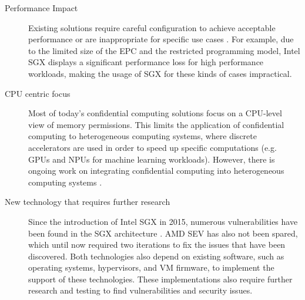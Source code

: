 \begin{description}
  \item[Performance Impact]
    Existing solutions require careful configuration to achieve acceptable
    performance or are inappropriate for specific use cases
    \cite{akram2021performance}. For example, due to the limited size of the EPC
    and the restricted programming model, Intel SGX displays a significant
    performance loss for high performance workloads, making the usage of SGX for
    these kinds of cases impractical.
  \item[CPU centric focus]
    Most of today's confidential computing solutions focus on a CPU-level view
    of memory permissions. This limits the application of confidential computing
    to heterogeneous computing systems, where discrete accelerators are used in
    order to speed up specific computations (e.g. GPUs and NPUs for machine
    learning workloads). However, there is ongoing work on integrating
    confidential computing into heterogeneous computing systems
    \cite{jiang2022cronus}.
  \item[New technology that requires further research]
    Since the introduction of Intel SGX in 2015, numerous vulnerabilities have
    been found in the SGX architecture \cite{fei2021sgxvulnerabilities}. AMD SEV
    has also not been spared, which until now required two iterations to fix the
    issues that have been discovered. Both technologies also depend on existing
    software, such as operating systems, hypervisors, and VM firmware, to
    implement the support of these technologies. These implementations also
    require further research and testing to find vulnerabilities and security
    issues.
\end{description}

